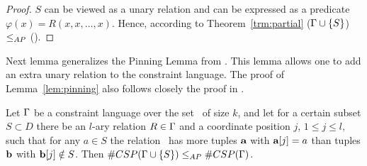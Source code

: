 \begin{proof}
\(S\) can be viewed as a unary relation and can be expressed as a predicate 
\(\varphi(x) = R(x,x,\dotsc,x)\)\@. Hence, according to Theorem~\ref{trm:partial}
\ccsp(\(\Gamma \cup \{{S}\}\)) \(\le_{AP}\) \ccsp(\mrelset)\@.
\end{proof}

Next lemma generalizes the Pinning Lemma from \cite{Trichotomy}.
This lemma allows one to add an extra unary relation to the constraint language. 
The proof of Lemma~\ref{lem:pinning} also follows closely the proof in \cite{Trichotomy}. 

\begin{lemma}\label{lem:pinning}
Let \(\Gamma\) be a constraint language over the set \mD\ of size \(k\)\@,
and let for a certain subset \(S \subset D\) 
there be an \(l\)-ary relation \(R \in \Gamma\) and a coordinate position \(j\),
\(1 \le j \le l\), such that for any \(a\in S\) the relation \mR\ has more tuples
\(\textbf{a}\) with \(\textbf{a}[j]=a\) than tuples \(\textbf{b}\) with
\(\textbf{b}[j] \notin S\)\@. Then \(\#CSP(\Gamma \cup \{{S}\}) \le_{AP} \#CSP(\Gamma)\)\@.
\end{lemma}

